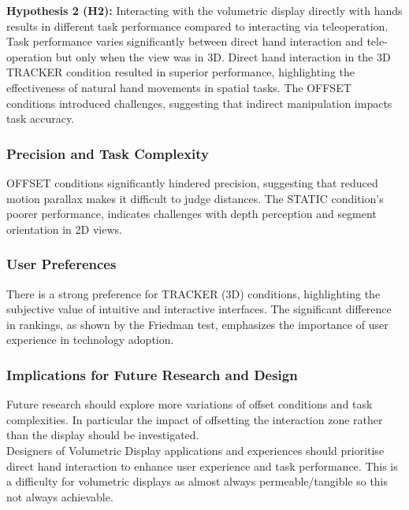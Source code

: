 \textbf{Hypothesis 2 (H2):} Interacting with the volumetric display directly with hands results in different task performance compared to interacting via teleoperation.\\

Task performance varies significantly between direct hand interaction and tele-operation but only when the view was in 3D. Direct hand interaction in the 3D TRACKER condition resulted in superior performance, highlighting the effectiveness of natural hand movements in spatial tasks. The OFFSET conditions introduced challenges, suggesting that indirect manipulation impacts task accuracy.
 
\subsubsection{Precision and Task Complexity}
OFFSET conditions significantly hindered precision, suggesting that reduced motion parallax makes it difficult to judge distances. The STATIC condition's poorer performance, indicates challenges with depth perception and segment orientation in 2D views. 

\subsubsection{User Preferences}
There is a strong preference for TRACKER (3D) conditions, highlighting the subjective value of intuitive and interactive interfaces. The significant difference in rankings, as shown by the Friedman test, emphasizes the importance of user experience in technology adoption.

\subsubsection{Implications for Future Research and Design}
Future research should explore more variations of offset conditions and task complexities. In particular the impact of offsetting the interaction zone rather than the display should be investigated.  \\

Designers of Volumetric Display applications and experiences should prioritise direct hand interaction to enhance user experience and task performance. This is a difficulty for volumetric displays as almost always permeable/tangible so this not always achievable. \\